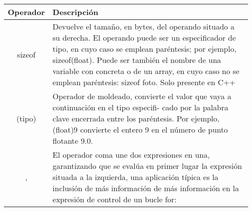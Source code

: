 

\begin{tabular}{|c|p{11cm}|}
	\hline
	\textbf{Operador} & \textbf{Descripción}  \\
	\hline
	sizeof & Devuelve el tamaño, en bytes, del operando situado a su derecha. El operando
	puede ser un especificador de tipo, en cuyo caso se emplean paréntesis; por ejemplo,
	sizeof(float). Puede ser también el nombre de una variable con concreta o de un array,
	en cuyo caso no se emplean paréntesis: sizeof foto. Solo presente en C++\\
	\hline
	(tipo) &  Operador de moldeado, convierte el valor que vaya a continuación en el tipo especifi-
	cado por la palabra clave encerrada entre los paréntesis. Por ejemplo, (float)9 convierte
	el entero 9 en el número de punto flotante 9.0. \\
	\hline
	, &  El operador coma une dos expresiones en una, garantizando que se evalúa en primer
	lugar la expresión situada a la izquierda, una aplicación típica es la inclusión de más
	información de más información en la expresión de control de un bucle for: \\
	\hline
	
\end{tabular}